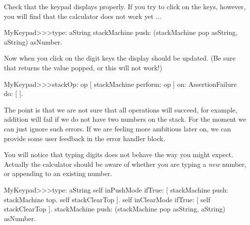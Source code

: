 \documentclass[a4paper,10pt,twoside]{book}
\begin{document}
Check that the keypad displays properly.
If you try to click on the keys, however, you will find that the calculator does not work yet ...

\begin{code}{}
MyKeypad>>>type: aString
	stackMachine push: (stackMachine pop asString, aString) asNumber.
\end{code}
Now when you click on the digit keys the display should be updated.
(Be sure that  returns the value popped, or this will not work!)



\begin{code}{}
MyKeypad>>>stackOp: op
	[ stackMachine perform: op ] on: AssertionFailure do: [ ].
\end{code}

The point is that we are not sure that all operations will succeed, for example, addition will fail if we do not have two numbers on the stack.
For the moment we can just ignore such errors.
If we are feeling more ambitious later on, we can provide some user feedback in the error handler block.


You will notice that typing digits does not behave the way you might expect.
Actually the calculator should be aware of whether you are typing a \emph{new} number, or appending to an existing number.


\begin{code}{}
MyKeypad>>>type: aString
	self inPushMode ifTrue: [
		stackMachine push: stackMachine top.
		self stackClearTop ].
	self inClearMode ifTrue: [ self stackClearTop ].
	stackMachine push: (stackMachine pop asString, aString) asNumber.
\end{code}
\end{document}
